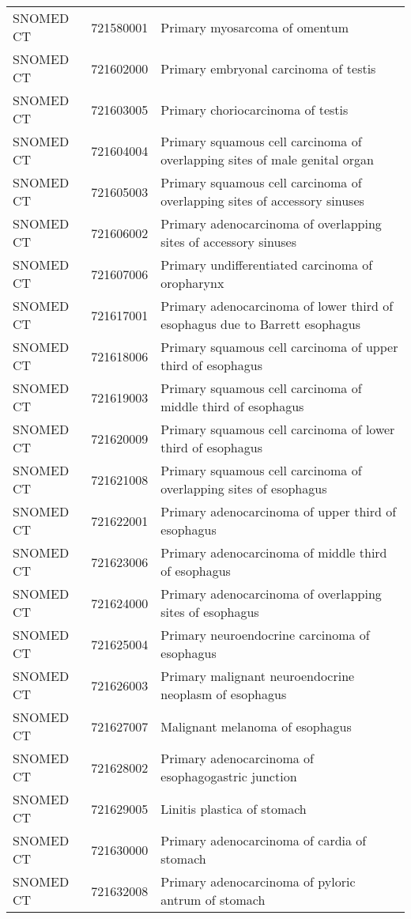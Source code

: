 \begin{longtable}{p{}p{}p{}}
  SNOMED CT & 721580001 & Primary myosarcoma of omentum \\ 
  SNOMED CT & 721602000 & Primary embryonal carcinoma of testis \\ 
  SNOMED CT & 721603005 & Primary choriocarcinoma of testis \\ 
  SNOMED CT & 721604004 & Primary squamous cell carcinoma of overlapping sites of male genital organ \\ 
  SNOMED CT & 721605003 & Primary squamous cell carcinoma of overlapping sites of accessory sinuses \\ 
  SNOMED CT & 721606002 & Primary adenocarcinoma of overlapping sites of accessory sinuses \\ 
  SNOMED CT & 721607006 & Primary undifferentiated carcinoma of oropharynx \\ 
  SNOMED CT & 721617001 & Primary adenocarcinoma of lower third of esophagus due to Barrett esophagus \\ 
  SNOMED CT & 721618006 & Primary squamous cell carcinoma of upper third of esophagus \\ 
  SNOMED CT & 721619003 & Primary squamous cell carcinoma of middle third of esophagus \\ 
  SNOMED CT & 721620009 & Primary squamous cell carcinoma of lower third of esophagus \\ 
  SNOMED CT & 721621008 & Primary squamous cell carcinoma of overlapping sites of esophagus \\ 
  SNOMED CT & 721622001 & Primary adenocarcinoma of upper third of esophagus \\ 
  SNOMED CT & 721623006 & Primary adenocarcinoma of middle third of esophagus \\ 
  SNOMED CT & 721624000 & Primary adenocarcinoma of overlapping sites of esophagus \\ 
  SNOMED CT & 721625004 & Primary neuroendocrine carcinoma of esophagus \\ 
  SNOMED CT & 721626003 & Primary malignant neuroendocrine neoplasm of esophagus \\ 
  SNOMED CT & 721627007 & Malignant melanoma of esophagus \\ 
  SNOMED CT & 721628002 & Primary adenocarcinoma of esophagogastric junction \\ 
  SNOMED CT & 721629005 & Linitis plastica of stomach \\ 
  SNOMED CT & 721630000 & Primary adenocarcinoma of cardia of stomach \\ 
  SNOMED CT & 721632008 & Primary adenocarcinoma of pyloric antrum of stomach \\ 

\end{longtable}
